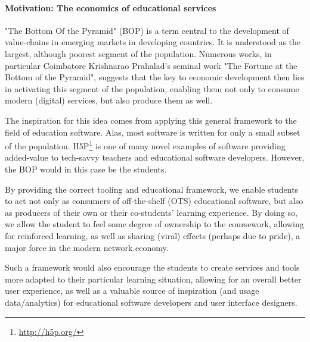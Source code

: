 \paragraph{Motivation: The economics of educational services}

"The Bottom Of the Pyramid" (BOP) is a term central to the development of
value-chains in emerging markets in developing countries. It is understood as
the largest, although poorest segment of the population. Numerous works, in
particular Coimbatore Krishnarao Prahalad's seminal work "The Fortune at the
Bottom of the Pyramid", suggests that the key to economic development then lies
in activating this segment of the population, enabling them not only to consume
modern (digital) services, but also produce them as 
well\cite{prahalad2009fortune}.

The inspiration for this idea comes from applying this general framework to the
field of education software. Alas, most software is written for only a small
subset of the population. H5P\footnote{\url{http://h5p.org/}} is one of many 
novel examples of software providing added-value to tech-savvy teachers and 
educational software developers. However, the BOP would in this case be the 
students.

By providing the correct tooling and educational framework, we enable students
to act not only as consumers of off-the-shelf (OTS) educational software, but
also as producers of their own or their co-students' learning experience. By
doing so, we allow the student to feel some degree of ownership to the
coursework, allowing for reinforced learning, as well as sharing (viral) effects
(perhaps due to pride), a major force in the modern network economy.

Such a framework would also encourage the students to create services and tools
more adapted to their particular learning situation, allowing for an overall
better user experience, as well as a valuable source of inspiration (and usage
data/analytics) for educational software developers and user interface
designers.
